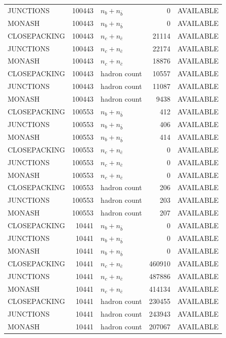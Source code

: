\begin{landscape}
\begin{longtable}{@{}lrlrl@{}}
JUNCTIONS & 100443 & $n_b+n_{\bar b}$ & \num{0} & AVAILABLE \\
MONASH & 100443 & $n_b+n_{\bar b}$ & \num{0} & AVAILABLE \\
CLOSEPACKING & 100443 & $n_c+n_{\bar c}$ & \num{21114} & AVAILABLE \\
JUNCTIONS & 100443 & $n_c+n_{\bar c}$ & \num{22174} & AVAILABLE \\
MONASH & 100443 & $n_c+n_{\bar c}$ & \num{18876} & AVAILABLE \\
CLOSEPACKING & 100443 & hadron count & \num{10557} & AVAILABLE \\
JUNCTIONS & 100443 & hadron count & \num{11087} & AVAILABLE \\
MONASH & 100443 & hadron count & \num{9438} & AVAILABLE \\
CLOSEPACKING & 100553 & $n_b+n_{\bar b}$ & \num{412} & AVAILABLE \\
JUNCTIONS & 100553 & $n_b+n_{\bar b}$ & \num{406} & AVAILABLE \\
MONASH & 100553 & $n_b+n_{\bar b}$ & \num{414} & AVAILABLE \\
CLOSEPACKING & 100553 & $n_c+n_{\bar c}$ & \num{0} & AVAILABLE \\
JUNCTIONS & 100553 & $n_c+n_{\bar c}$ & \num{0} & AVAILABLE \\
MONASH & 100553 & $n_c+n_{\bar c}$ & \num{0} & AVAILABLE \\
CLOSEPACKING & 100553 & hadron count & \num{206} & AVAILABLE \\
JUNCTIONS & 100553 & hadron count & \num{203} & AVAILABLE \\
MONASH & 100553 & hadron count & \num{207} & AVAILABLE \\
CLOSEPACKING & 10441 & $n_b+n_{\bar b}$ & \num{0} & AVAILABLE \\
JUNCTIONS & 10441 & $n_b+n_{\bar b}$ & \num{0} & AVAILABLE \\
MONASH & 10441 & $n_b+n_{\bar b}$ & \num{0} & AVAILABLE \\
CLOSEPACKING & 10441 & $n_c+n_{\bar c}$ & \num{460910} & AVAILABLE \\
JUNCTIONS & 10441 & $n_c+n_{\bar c}$ & \num{487886} & AVAILABLE \\
MONASH & 10441 & $n_c+n_{\bar c}$ & \num{414134} & AVAILABLE \\
CLOSEPACKING & 10441 & hadron count & \num{230455} & AVAILABLE \\
JUNCTIONS & 10441 & hadron count & \num{243943} & AVAILABLE \\
MONASH & 10441 & hadron count & \num{207067} & AVAILABLE \\

\end{longtable}
\end{landscape}
